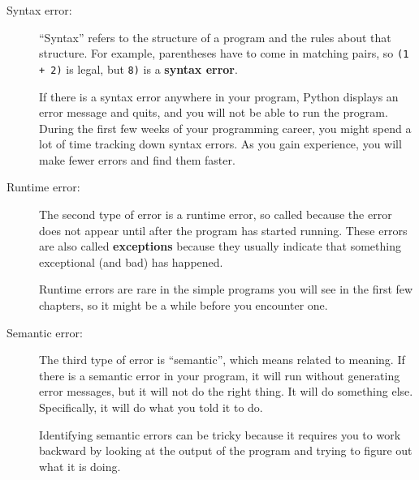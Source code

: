 \begin{description}

\item[Syntax error:] ``Syntax'' refers to the structure of a program
  and the rules about that structure.  For example, parentheses have
  to come in matching pairs, so {\tt (1 + 2)} is legal, but {\tt 8)}
  is a {\bf syntax error}.   

If there is a syntax error
anywhere in your program, Python displays an error message and quits,
and you will not be able to run the program.  During the first few
weeks of your programming career, you might spend a lot of
time tracking down syntax errors.  As you gain experience, you will
make fewer errors and find them faster.


\item[Runtime error:] The second type of error is a runtime error, so
  called because the error does not appear until after the program has
  started running.  These errors are also called {\bf exceptions}
  because they usually indicate that something exceptional (and bad)
  has happened.   
    

Runtime errors are rare in the simple programs you will see in the
first few chapters, so it might be a while before you encounter one.


\item[Semantic error:] The third type of error is ``semantic'', which
  means related to meaning.  If there is a semantic error in your
  program, it will run without generating error messages, but it will
  not do the right thing.  It will do something else.  Specifically,
  it will do what you told it to do.  
   

Identifying semantic errors can be tricky because it requires you to work
backward by looking at the output of the program and trying to figure
out what it is doing.

\end{description}

